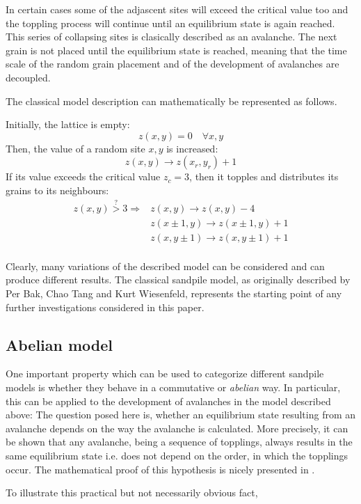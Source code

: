 In certain cases some of the adjascent sites will exceed the critical value too and the toppling process will continue until an equilibrium state is again reached. This series of collapsing sites is clasically described as an avalanche. The next grain is not placed until the equilibrium state is reached, meaning that the time scale of the random grain placement and of the development of avalanches are decoupled.

The classical model description can mathematically be represented as follows.

Initially, the lattice is empty:
\[
z(x,y) = 0 \quad\forall x, y
\]
Then, the value of a random site $x,y$ is increased:
\[
z(x,y) \to z(x_r,y_r) + 1
\]
If its value exceeds the critical value $z_c=3$, then it topples and distributes its grains to its neighbours:
\[
\begin{aligned}
z(x,y) \overset{?}{>} 3 \Rightarrow & z(x,y) \to z(x,y)-4 \\
 & z(x\pm 1,y) \to z(x\pm 1,y)+1 \\
 & z(x,y\pm 1) \to z(x,y\pm 1)+1 \\
\end{aligned}
\]

Clearly, many variations of the described model can be considered and can produce different results. The classical sandpile model, as originally described by Per Bak, Chao Tang and Kurt Wiesenfeld, represents the starting point of any further investigations considered in this paper.

\subsection{Abelian model}
One important property which can be used to categorize different sandpile models is whether they behave in a commutative or \emph{abelian} way. In particular, this can be applied to the development of avalanches in the model described above: The question posed here is, whether an equilibrium state resulting from an avalanche depends on the way the avalanche is calculated. More precisely, it can be shown that any avalanche, being a sequence of topplings, always results in the same equilibrium state i.e. does not depend on the order, in which the topplings occur. The mathematical proof of this hypothesis is nicely presented in \cite{sandpile_math}.

To illustrate this practical but not necessarily obvious fact, 

